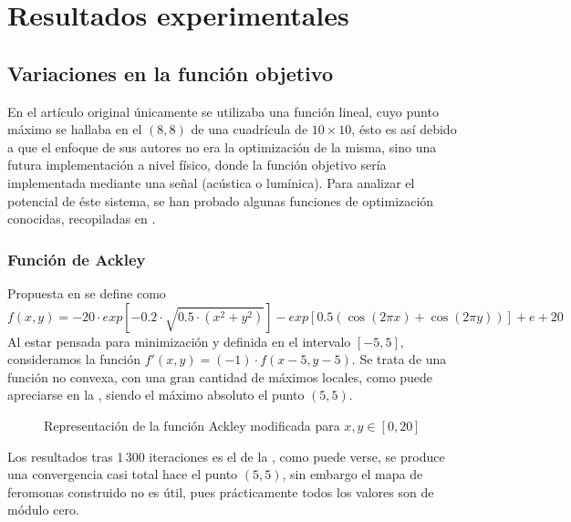 	\section{Resultados experimentales}
	\label{sec:resultados}
	
	
	
	
	\subsection{Variaciones en la función objetivo}
	En el artículo original \cite{initialPaper} únicamente se utilizaba una función lineal, cuyo punto máximo se hallaba en el $(8,8)$ de una cuadrícula de $10\times10$, ésto es así debido a que el enfoque de sus autores no era la optimización de la misma, sino una futura implementación a nivel físico, donde la función objetivo sería implementada mediante una señal (acústica o lumínica). Para analizar el potencial de éste sistema, se han probado algunas funciones de optimización conocidas, recopiladas en \cite{WebFuncionesOptimizacion}.
	
	\subsubsection{Función de Ackley} Propuesta en \cite{AckleyFunction} se define como
	\[ f(x,y)=-20 \cdot exp[-0.2 \cdot \sqrt{0.5 \cdot (x^2 + y^2)}] - exp[0.5 ( \cos(2 \pi x)
	+ \cos(2 \pi y))] + e + 20\]
	Al estar pensada para minimización y definida en el intervalo $[-5,5]$, consideramos la función $f'(x,y)=(-1)\cdot f(x-5, y-5)$. Se trata de una función no convexa, con una gran cantidad de máximos locales, como puede apreciarse en la , siendo el máximo absoluto el punto $(5,5)$.
	
	\begin{figure}[htbp]
	    \centering
	    \caption{Representación de la función Ackley modificada para $x,y\in[0,20]$}
	    \label{fig:2}
	\end{figure}
	
	Los resultados tras 1\,300 iteraciones es el de la , como puede verse, se produce una convergencia casi total hace el punto $(5,5)$, sin embargo el mapa de feromonas construido no es útil, pues prácticamente todos los valores son de módulo cero.
	
